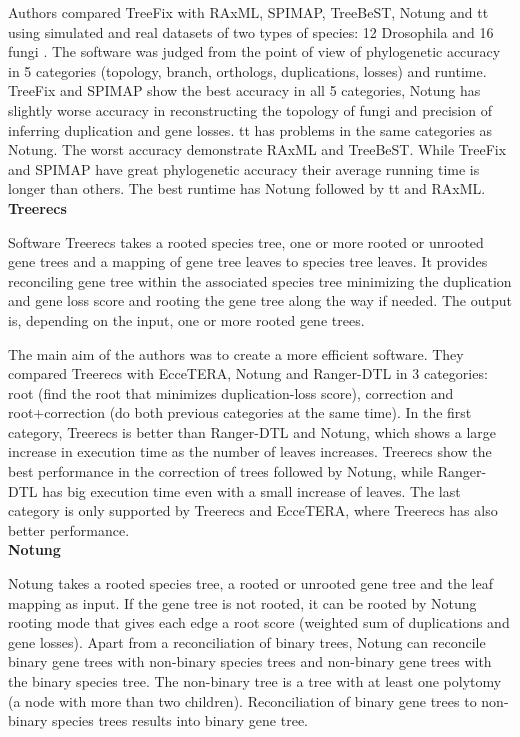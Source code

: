 Authors compared TreeFix with RAxML, SPIMAP, TreeBeST, Notung and tt using simulated and real datasets of two types of species: 12 Drosophila and 16 fungi \cite{treefix_online}. The software was judged from the point of view of phylogenetic accuracy in 5 categories (topology, branch, orthologs, duplications, losses) and runtime. TreeFix and SPIMAP show the best accuracy in all 5 categories, Notung has slightly worse accuracy in reconstructing the topology of fungi and precision of inferring duplication and gene losses. tt has problems in the same categories as Notung. The worst accuracy demonstrate RAxML and TreeBeST. While TreeFix and SPIMAP have great phylogenetic accuracy their average running time is longer than others. The best runtime has Notung followed by tt and RAxML.\\
\textbf{Treerecs} 

Software Treerecs \cite{treerecs_tutorial} takes a rooted species tree, one or more rooted or unrooted gene trees and a mapping of gene tree leaves to species tree leaves. It provides reconciling gene tree within the associated species tree minimizing the duplication and gene loss score and rooting the gene tree along the way if needed. The output is, depending on the input, one or more rooted gene trees.

The main aim of the authors was to create a more efficient software. They compared Treerecs with EcceTERA, Notung and Ranger-DTL in 3 categories: root (find the root that minimizes duplication-loss score), correction and root+correction (do both previous categories at the same time). In the first category, Treerecs is better than Ranger-DTL and Notung, which shows a large increase in execution time as the number of leaves increases. Treerecs show the best performance in the correction of trees followed by Notung, while Ranger-DTL has big execution time even with a small increase of leaves. The last category is only supported by Treerecs and EcceTERA, where Treerecs has also better performance.\\
\textbf{Notung}  

Notung \cite{notung} takes a rooted species tree, a rooted or unrooted gene tree and the leaf mapping as input. If the gene tree is not rooted, it can be rooted by Notung rooting mode that gives each edge a root score (weighted sum of duplications and gene losses). Apart from a reconciliation of binary trees, Notung can reconcile binary gene trees with non-binary species trees and non-binary gene trees with the binary species tree. The non-binary tree is a tree with at least one polytomy (a node with more than two children). Reconciliation of binary gene trees to non-binary species trees results into binary gene tree.

